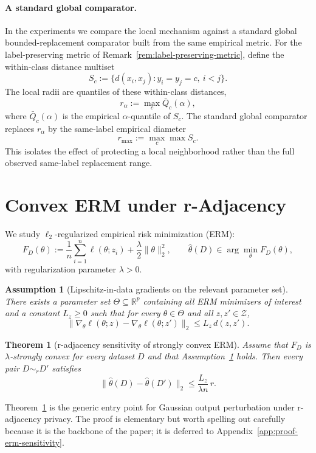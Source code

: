 \documentclass[conference,compsoc]{IEEEtran}
\newtheorem{assumption}{Assumption}
\newtheorem{theorem}{Theorem}
\begin{document}
\paragraph{A standard global comparator.}
In the experiments we compare the local mechanism against a standard global bounded-replacement comparator built from the same empirical metric. For the label-preserving metric of Remark~\ref{rem:label-preserving-metric}, define the within-class distance multiset
\[
S_c:=\{d(x_i,x_j): y_i=y_j=c,\ i<j\}.
\]
The local radii are quantiles of these within-class distances,
\[
r_\alpha:=\max_c \bar Q_c(\alpha),
\]
where $\bar Q_c(\alpha)$ is the empirical $\alpha$-quantile of $S_c$. The standard global comparator replaces $r_\alpha$ by the same-label empirical diameter
\[
r_{\max}:=\max_c \max S_c.
\]
This isolates the effect of protecting a local neighborhood rather than the full observed same-label replacement range.

\section{Convex ERM under r-Adjacency}
\label{sec:erm}

We study $\ell_2$-regularized empirical risk minimization (ERM):
\[
F_D(\theta):=\frac{1}{n}\sum_{i=1}^n \ell(\theta;z_i)+\frac{\lambda}{2}\|\theta\|_2^2,
\qquad
\hat\theta(D)\in\arg\min_\theta F_D(\theta),
\]
with regularization parameter $\lambda>0$.

\begin{assumption}[Lipschitz-in-data gradients on the relevant parameter set]
\label{ass:lz}
There exists a parameter set $\Theta\subseteq\mathbb{R}^p$ containing all ERM minimizers of interest and a constant $L_z\ge 0$ such that for every $\theta\in\Theta$ and all $z,z'\in\mathcal{Z}$,
\[
\|\nabla_\theta \ell(\theta;z)-\nabla_\theta \ell(\theta;z')\|_2\le L_z\,d(z,z').
\]
\end{assumption}

\begin{theorem}[r-adjacency sensitivity of strongly convex ERM]
\label{thm:erm-sensitivity}
Assume that $F_D$ is $\lambda$-strongly convex for every dataset $D$ and that Assumption~\ref{ass:lz} holds. Then every pair $D\sim_r D'$ satisfies
\[
\|\hat\theta(D)-\hat\theta(D')\|_2\le \frac{L_z}{\lambda n}\,r.
\]
\end{theorem}

Theorem~\ref{thm:erm-sensitivity} is the generic entry point for Gaussian output perturbation under r-adjacency privacy. The proof is elementary but worth spelling out carefully because it is the backbone of the paper; it is deferred to Appendix~\ref{app:proof-erm-sensitivity}.
\end{document}
